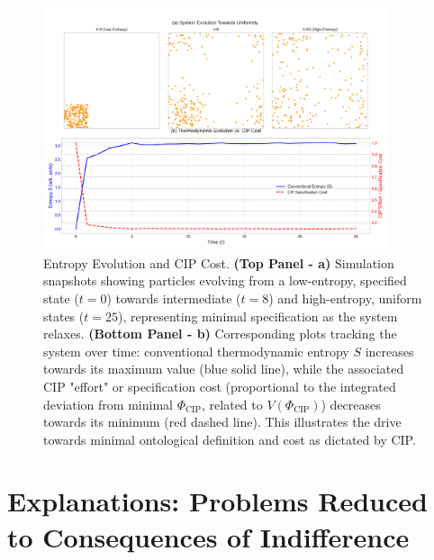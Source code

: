 \documentclass[11pt, a4paper]{article}
\newcommand{\subt}[1]{\mathrm{#1}}
\begin{document}

\begin{figure}[H] %
    \centering
    \includegraphics[width=0.9\textwidth]{CIP_EntropyTime.png} 
    \caption[Entropy Evolution and CIP Cost]{Entropy Evolution and CIP Cost. 
    \textbf{(Top Panel - a)} Simulation snapshots showing particles evolving from a low-entropy, specified state ($t=0$) towards intermediate ($t=8$) and high-entropy, uniform states ($t=25$), representing minimal specification as the system relaxes. 
    \textbf{(Bottom Panel - b)} Corresponding plots tracking the system over time: conventional thermodynamic entropy $S$ increases towards its maximum value (blue solid line), while the associated CIP "effort" or specification cost (proportional to the integrated deviation from minimal $\Phi_{\subt{CIP}}$, related to $V(\Phi_{\subt{CIP}})$) decreases towards its minimum (red dashed line). This illustrates the drive towards minimal ontological definition and cost as dictated by CIP.}
    \label{fig:entropy_time} %
\end{figure}



\section{Explanations: Problems Reduced to Consequences of Indifference} \label{sec:explanations}
\end{document}
